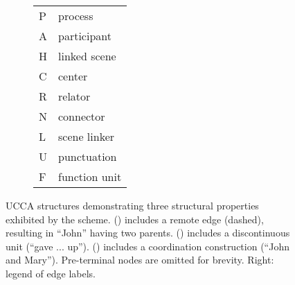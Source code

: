 \documentclass[11pt,a4paper]{article}
\begin{document}
\begin{figure}[t]
\begin{subfigure}{.9\columnwidth}
{\begin{adjustbox}{width=.3\columnwidth,margin=1pt,frame}
  \begin{tabular}{ll}
	  P & process \\
	  A & participant \\
	  H & linked scene \\
	  C & center \\
	  R & relator \\
	  N & connector \\
	  L & scene linker \\
	  U & punctuation \\
	  F & function unit
  \end{tabular}
  \end{adjustbox}
  }
  \end{subfigure}
  \begin{subfigure}{.9\columnwidth}
  \vspace{-1cm}
  \parbox{.05\columnwidth}{\caption{}\label{fig:home}}
  \parbox{.65\columnwidth}{
  }
  \end{subfigure}
  \caption{\label{fig:examples}
    UCCA structures demonstrating three structural properties exhibited by
    the scheme.
    () includes a remote edge (dashed),
    resulting in ``John'' having two parents.
    () includes a discontinuous unit (``gave ... up'').
    () includes a coordination construction (``John and Mary'').
    Pre-terminal nodes are omitted for brevity.
    Right: legend of edge labels.
  }
\end{figure}
\end{document}
